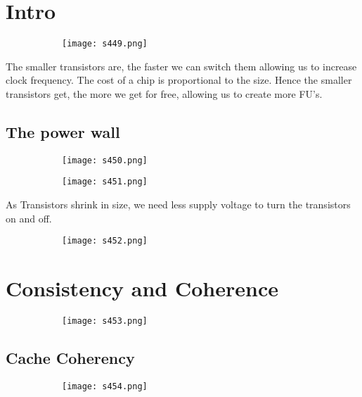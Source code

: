 \documentclass[8pt]{extreport}
\begin{document}
\section{Intro}
 \begin{figure}[H]
\begin{subfigure}[b]{0.4\linewidth}
\texttt{[image: s449.png]}
\end{subfigure}
\end{figure}
The smaller transistors are, the faster we can switch them allowing us to increase clock frequency. The cost of a chip is proportional to the size. Hence the smaller transistors get, the more we get for free, allowing us to create more FU's.

\subsection{The power wall}
 \begin{figure}[H]
\begin{subfigure}[b]{0.4\linewidth}
\texttt{[image: s450.png]}
\end{subfigure}
\begin{subfigure}[b]{0.4\linewidth}
\texttt{[image: s451.png]}
\end{subfigure}
\end{figure}
As Transistors shrink in size, we need less supply voltage to turn the transistors on and off.
 \begin{figure}[H]
\begin{subfigure}[b]{0.4\linewidth}
\texttt{[image: s452.png]}
\end{subfigure}
\end{figure}



\section{Consistency and Coherence}
 \begin{figure}[H]
\begin{subfigure}[b]{0.4\linewidth}
\texttt{[image: s453.png]}
\end{subfigure}
\end{figure}

\subsection{Cache Coherency}
 \begin{figure}[H]
\begin{subfigure}[b]{0.4\linewidth}
\texttt{[image: s454.png]}
\end{subfigure}
\end{figure}
\end{document}

